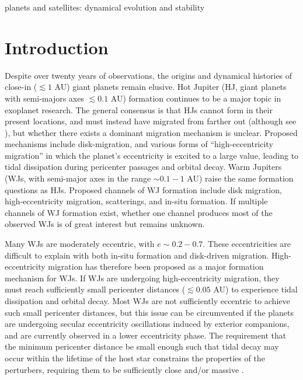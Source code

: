 \documentclass[12pt,useAMS, usenatbib]{mn2e}
\begin{document}
\begin{keywords}
planets and satellites: dynamical evolution and stability
\end{keywords}

\section{Introduction}
Despite over twenty years of observations, the origins and dynamical histories of close-in ($\lesssim 1$ AU) giant planets remain elusive.  Hot Jupiter (HJ, giant planets with semi-majors axes $\lesssim 0.1$ AU)  formation continues to be a major topic in exoplanet research.   The general consensus is that HJs cannot form in their present locations, and must instead have migrated from farther out (although see \citealt{boley2016,batygin2016}), but whether there exists a dominant migration mechanism is unclear.  Proposed mechanisms include disk-migration, and various forms of ``high-eccentricity migration'' in which the planet's eccentricity is excited to a large value, leading to tidal dissipation during pericenter passages and orbital decay.  Warm Jupiters (WJs, with semi-major axes in the range $\sim 0.1 - 1$ AU) raise the same formation questions as HJs.  Proposed channels of WJ formation include disk migration, high-eccentricity migration, scatterings, and in-situ formation.  If multiple channels of WJ formation exist, whether one channel produces most of the observed WJs is of great interest but remains unknown.

Many WJs are moderately eccentric, with $e \sim 0.2 - 0.7$.  These eccentricities are difficult to explain with both in-situ formation and disk-driven migration.  High-eccentricity migration has therefore been proposed as a major formation mechanism for WJs.  If WJs are undergoing high-eccentricity migration, they must reach sufficiently small pericenter distances ($\lesssim 0.05$ AU) to experience tidal dissipation and orbital decay.  Most WJs are not sufficiently eccentric to achieve such small pericenter distances, but this issue can be circumvented if the planets are undergoing secular eccentricity oscillations induced by exterior companions, and are currently observed in a lower eccentricity phase.  The requirement that the minimum pericenter distance be small enough such that tidal decay may occur within the lifetime of the host star constrains the properties of the perturbers, requiring them to be sufficiently close and/or massive \citep{dong2014}.  
\end{document}
